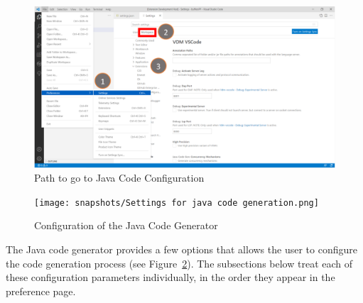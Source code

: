 \begin{figure}[htbp]
\begin{center}
\includegraphics[width=16cm]{snapshots/Path to go to VDM settings.PNG}
\caption{Path to go to Java Code Configuration\label{fig:pathVDMSettings1}}
\end{center}
\end{figure}

\begin{figure}[htbp]
\begin{center}
\texttt{[image: snapshots/Settings for java code generation.png]}
\caption{Configuration of the Java Code Generator\label{fig:javaGenerationConfiguration}}
\end{center}
\end{figure}

\newpage
The Java code generator provides a few options that allows the user to configure the code generation process (see Figure~\ref{fig:javaGenerationConfiguration}). The subsections
below treat each of these configuration parameters individually, in the order they appear
in the preference page.

